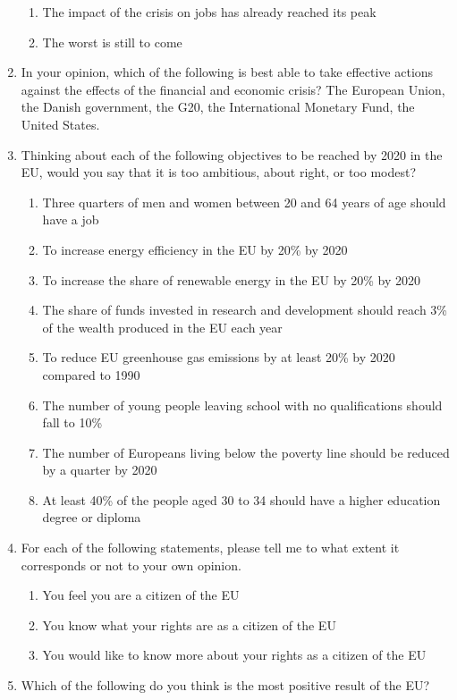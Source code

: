 \documentclass[12pt, a4]{article}
\begin{document}
\begin{enumerate}
\begin{enumerate}
			\item The impact of the crisis on jobs has already reached its peak
			\item The worst is still to come
		\end{enumerate}
	\item In your opinion, which of the following is best able to take effective actions against the effects of the financial and economic crisis? The European Union, the Danish government, the G20, the International Monetary Fund, the United States.
	\item Thinking about each of the following objectives to be reached by 2020 in the EU, would you say that it is too ambitious, about right, or too modest?
		\begin{enumerate}
			\item Three quarters of men and women between 20 and 64 years of age should have a job
			\item To increase energy efficiency in the EU by 20\% by 2020
			\item To increase the share of renewable energy in the EU by 20\% by 2020
			\item The share of funds invested in research and development should reach 3\% of the wealth produced in the EU each year
			\item To reduce EU greenhouse gas emissions by at least 20\% by 2020 compared to 1990
			\item The number of young people leaving school with no qualifications should fall to 10\%
			\item The number of Europeans living below the poverty line should be reduced by a quarter by 2020
			\item At least 40\% of the people aged 30 to 34 should have a higher education degree or diploma
		\end{enumerate}
	\item For each of the following statements, please tell me to what extent it corresponds or not to your own opinion.
		\begin{enumerate}
			\item You feel you are a citizen of the EU
			\item You know what your rights are as a citizen of the EU
			\item You would like to know more about your rights as a citizen of the EU
		\end{enumerate}
	\item Which of the following do you think is the most positive result of the EU?

\end{enumerate}
\end{document}
